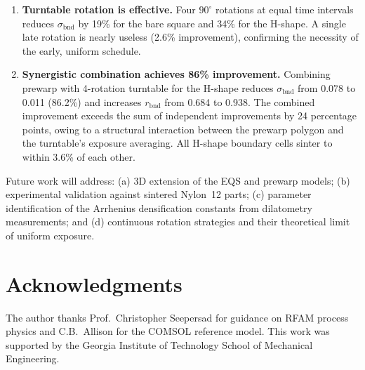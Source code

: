 \documentclass[5p,times]{elsarticle}
\newcommand{\bndstd}{\sigma_{\mathrm{bnd}}}
\begin{document}
\begin{enumerate}
\item \textbf{Turntable rotation is effective.}  Four $90^\circ$
      rotations at equal time intervals reduces $\bndstd$ by 19\% for
      the bare square and 34\% for the H-shape.  A single late rotation
      is nearly useless (2.6\% improvement), confirming the necessity
      of the early, uniform schedule.

\item \textbf{Synergistic combination achieves 86\% improvement.}
      Combining prewarp with 4-rotation turntable for the H-shape
      reduces $\bndstd$ from 0.078 to 0.011 (86.2\%) and increases
      $r_{\mathrm{bnd}}$ from 0.684 to 0.938.  The combined improvement
      exceeds the sum of independent improvements by 24 percentage
      points, owing to a structural interaction between the prewarp
      polygon and the turntable's exposure averaging.  All H-shape
      boundary cells sinter to within 3.6\% of each other.

\end{enumerate}

Future work will address: (a) 3D extension of the EQS and prewarp
models; (b) experimental validation against sintered Nylon~12 parts;
(c) parameter identification of the Arrhenius densification constants
from dilatometry measurements; and (d) continuous rotation strategies
and their theoretical limit of uniform exposure.

\section*{Acknowledgments}

The author thanks Prof.\ Christopher Seepersad for guidance on RFAM
process physics and C.B.\ Allison for the COMSOL reference model.
This work was supported by the Georgia Institute of Technology School
of Mechanical Engineering.



\end{document}
